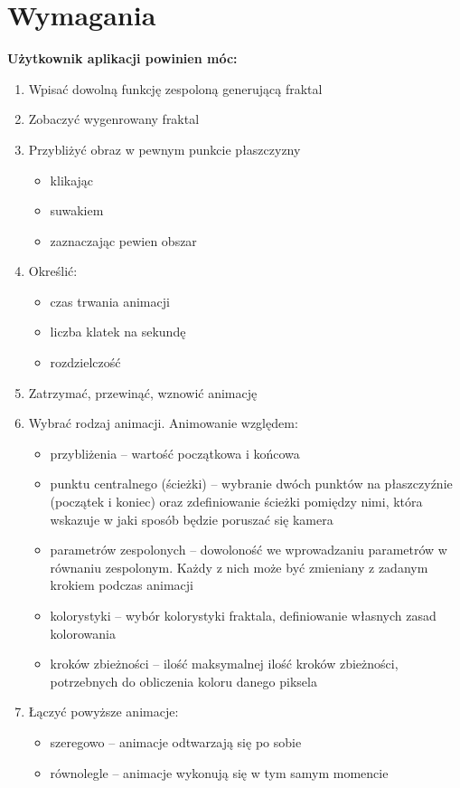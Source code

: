 \documentclass[a4paper]{article}
\begin{document}
\section{Wymagania}
\textbf{Użytkownik aplikacji powinien móc:}
\begin{enumerate}
\item Wpisać dowolną funkcję zespoloną generującą fraktal
\item Zobaczyć wygenrowany fraktal
\item Przybliżyć obraz w pewnym punkcie płaszczyzny
\begin{itemize}
\item klikając
\item suwakiem
\item zaznaczając pewien obszar
\end{itemize}
\item Określić:
\begin{itemize}
\item czas trwania animacji
\item liczba klatek na sekundę
\item rozdzielczość
\end{itemize}

\item Zatrzymać, przewinąć, wznowić animację
\item Wybrać rodzaj animacji. Animowanie względem:
\begin{itemize}
\item przybliżenia -- wartość początkowa i końcowa
\item punktu centralnego (ścieżki) -- wybranie dwóch punktów na płaszczyźnie (początek i koniec) oraz zdefiniowanie ścieżki pomiędzy nimi, która wskazuje w jaki sposób będzie poruszać się kamera
\item parametrów zespolonych -- dowoloność we wprowadzaniu parametrów w równaniu zespolonym. Każdy z nich może być zmieniany z zadanym krokiem podczas animacji
\item kolorystyki -- wybór kolorystyki fraktala, definiowanie własnych zasad kolorowania
\item kroków zbieżności -- ilość maksymalnej ilość kroków zbieżności, potrzebnych do obliczenia koloru danego piksela
\end{itemize}

\item Łączyć powyższe animacje:
\begin{itemize}
\item szeregowo -- animacje odtwarzają się po sobie
\item równolegle -- animacje wykonują się w tym samym momencie
\end{itemize}


\end{enumerate}
\end{document}
